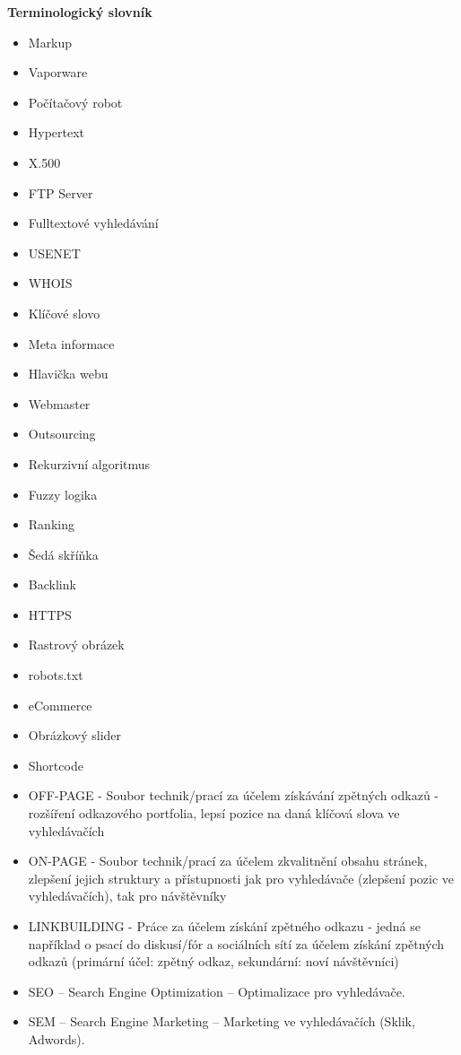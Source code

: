 \textsf{\textbf{\Large{}\hspace{20pt}}}\textsf{\textbf{\LARGE{}Terminologický
slovník}}\vspace{13pt}

\bigskip

\begin{itemize}
	\item Markup
\item Vaporware
\item Počítačový robot
\item Hypertext
\item X.500
\item FTP Server
\item Fulltextové vyhledávání
\item USENET
\item WHOIS
\item Klíčové slovo
\item Meta informace
\item Hlavička webu
\item Webmaster
\item Outsourcing
\item Rekurzivní algoritmus
\item Fuzzy logika
\item Ranking
\item Šedá skříňka
\item Backlink
\item HTTPS
\item Rastrový obrázek
\item robots.txt 
\item eCommerce
\item Obrázkový slider
\item Shortcode
\item OFF-PAGE - Soubor technik/prací za účelem získávání zpětných odkazů - rozšíření odkazového portfolia, lepsí pozice na daná klíčová slova ve vyhledávačích
\item ON-PAGE - Soubor technik/prací za účelem zkvalitnění obsahu stránek, zlepšení jejich struktury a přístupnosti jak pro vyhledávače (zlepšení pozic ve vyhledávačích), tak pro návštěvníky
\item LINKBUILDING - Práce za účelem získání zpětného odkazu - jedná se například o psací do diskusí/fór a sociálních sítí za účelem získání zpětných odkazů (primární účel: zpětný odkaz, sekundární: noví návštěvníci)
\item SEO – Search Engine Optimization – Optimalizace pro vyhledávače.
\item SEM – Search Engine Marketing – Marketing ve vyhledávačích (Sklik, Adwords).

\end{itemize}
